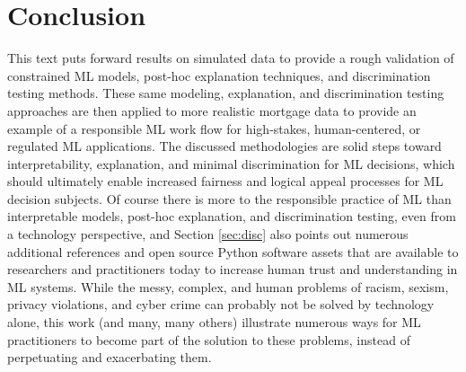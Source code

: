 \documentclass[information,article,submit,moreauthors,pdftex]{definitions/mdpi}
\begin{document}
\section{Conclusion}\label{sec:con}

This text puts forward results on simulated data to provide a rough validation of constrained ML models, post-hoc explanation techniques, and discrimination testing methods. These same modeling, explanation, and discrimination testing approaches are then applied to more realistic mortgage data to provide an example of a responsible ML work flow for high-stakes, human-centered, or regulated ML applications. The discussed methodologies are solid steps toward interpretability, explanation, and minimal discrimination for ML decisions, which should ultimately enable increased fairness and logical appeal processes for ML decision subjects. Of course there is more to the responsible practice of ML than interpretable models, post-hoc explanation, and discrimination testing, even from a technology perspective, and Section \ref{sec:disc} also points out numerous additional references and open source Python software assets that are available to researchers and practitioners today to increase human trust and understanding in ML systems. While the messy, complex, and human problems of racism, sexism, privacy violations, and cyber crime can probably not be solved by technology alone, this work (and many, many others) illustrate numerous ways for ML practitioners to become part of the solution to these problems, instead of perpetuating and exacerbating them. 

\vspace{6pt} 

\end{document}
